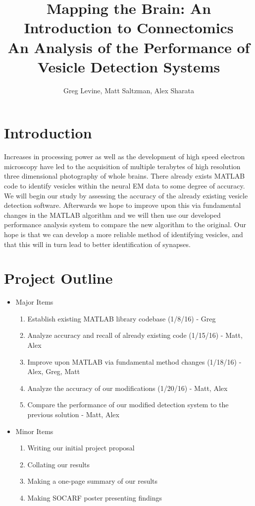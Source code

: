 \documentclass[11pt]{article} %
\title{Mapping the Brain: An Introduction to Connectomics\\An Analysis of the Performance of Vesicle Detection Systems}
\author{Greg Levine, Matt Saltzman, Alex Sharata}
\begin{document}
\maketitle

\section{Introduction}

Increases in processing power as well as the development of high speed electron microscopy have led to the acquisition of multiple terabytes of high resolution three dimensional photography of whole brains. There already exists MATLAB code to identify vesicles within the neural EM data to some degree of accuracy. We will begin our study by assessing the accuracy of the already existing vesicle detection software. Afterwards we hope to improve upon this via fundamental changes in the MATLAB algorithm and we will then use our developed performance analysis system to compare the new algorithm to the original. Our hope is that we can develop a more reliable method of identifying vesicles, and that this will in turn lead to better identification of synapses.

\section{Project Outline}
\begin{itemize}
\item Major Items
\begin{enumerate}
\item Establish existing MATLAB library codebase (1/8/16) - Greg
\item Analyze accuracy and recall of already existing code (1/15/16) - Matt, Alex
\item Improve upon MATLAB via fundamental method changes (1/18/16) - Alex, Greg, Matt
\item Analyze the accuracy of our modifications (1/20/16) - Matt, Alex
\item Compare the performance of our modified detection system to the previous solution - Matt, Alex
\end{enumerate}

\item Minor Items
\begin{enumerate}
\item Writing our initial project proposal
\item Collating our results
\item Making a one-page summary of our results
\item Making SOCARF poster presenting findings
\end{enumerate}

\end{itemize}
\end{document}
